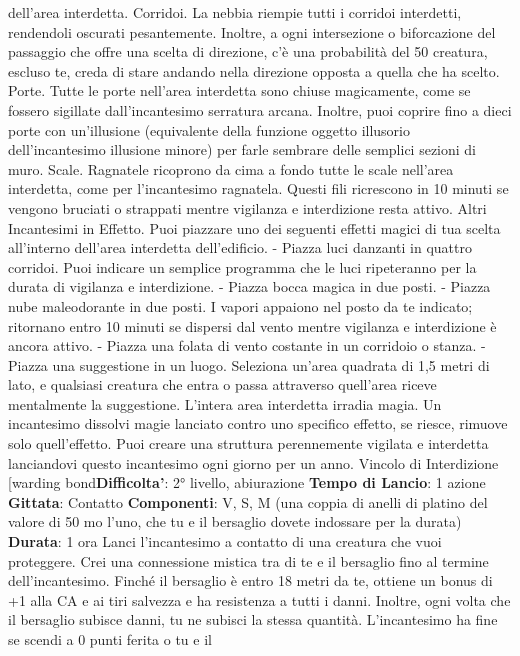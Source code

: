 \begin{multicols}{2}
dell’area interdetta.
Corridoi. La nebbia riempie tutti i corridoi interdetti,
rendendoli oscurati pesantemente. Inoltre, a ogni
intersezione o biforcazione del passaggio che offre una
scelta di direzione, c’è una probabilità del 50%
creatura, escluso te, creda di stare andando nella
direzione opposta a quella che ha scelto.
Porte. Tutte le porte nell’area interdetta sono chiuse
magicamente, come se fossero sigillate
dall’incantesimo serratura arcana. Inoltre, puoi coprire
fino a dieci porte con un’illusione (equivalente della
funzione oggetto illusorio dell’incantesimo illusione
minore) per farle sembrare delle semplici sezioni di
muro.
Scale. Ragnatele ricoprono da cima a fondo tutte le
scale nell’area interdetta, come per l’incantesimo
ragnatela. Questi fili ricrescono in 10 minuti se vengono
bruciati o strappati mentre vigilanza e interdizione resta
attivo.
Altri Incantesimi in Effetto. Puoi piazzare uno dei
seguenti effetti magici di tua scelta all’interno dell’area
interdetta dell’edificio.
- Piazza luci danzanti in quattro corridoi. Puoi indicare
un semplice programma che le luci ripeteranno per
la durata di vigilanza e interdizione.
- Piazza bocca magica in due posti.
- Piazza nube maleodorante in due posti. I vapori
appaiono nel posto da te indicato; ritornano entro 10
minuti se dispersi dal vento mentre vigilanza e
interdizione è ancora attivo.
- Piazza una folata di vento costante in un corridoio o
stanza.
- Piazza una suggestione in un luogo. Seleziona
un’area quadrata di 1,5 metri di lato, e qualsiasi
creatura che entra o passa attraverso quell’area
riceve mentalmente la suggestione.
L’intera area interdetta irradia magia. Un incantesimo
dissolvi magie lanciato contro uno specifico effetto, se
riesce, rimuove solo quell’effetto.
Puoi creare una struttura perennemente vigilata e
interdetta lanciandovi questo incantesimo ogni giorno
per un anno.
Vincolo di Interdizione
[warding bond\textbf{Difficolta'}:
2° livello, abiurazione
\textbf{Tempo di Lancio}: 1 azione
\textbf{Gittata}: Contatto
\textbf{Componenti}: V, S, M (una coppia di anelli di platino del
valore di 50 mo l’uno, che tu e il bersaglio dovete
indossare per la durata)
\textbf{Durata}: 1 ora
Lanci l’incantesimo a contatto di una creatura che vuoi
proteggere. Crei una connessione mistica tra di te e il
bersaglio fino al termine dell’incantesimo. Finché il
bersaglio è entro 18 metri da te, ottiene un bonus di +1
alla CA e ai tiri salvezza e ha resistenza a tutti i danni.
Inoltre, ogni volta che il bersaglio subisce danni, tu ne
subisci la stessa quantità.
L’incantesimo ha fine se scendi a 0 punti ferita o tu e il

\end{multicols}

